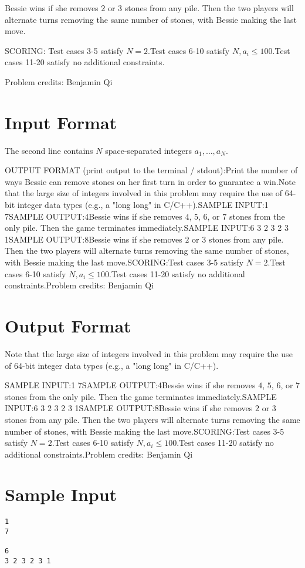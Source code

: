 \documentclass[12pt]{article}
\begin{document}
Bessie wins if she removes $2$ or $3$ stones from any pile. Then the two players
will alternate turns removing the same number of stones, with Bessie making the
last move.

SCORING:
Test cases 3-5 satisfy $N=2$.Test cases 6-10 satisfy $N,a_i\le 100$.Test cases 11-20 satisfy no additional constraints.


Problem credits: Benjamin Qi



\section*{Input Format}
The second line contains $N$ space-separated integers $a_1,\ldots,a_N$.

OUTPUT FORMAT (print output to the terminal / stdout):Print the number of ways Bessie can remove stones on her first turn in order
to guarantee a win.Note that the large size of integers involved in this problem may require the use of 64-bit integer data types (e.g., a "long long" in C/C++).SAMPLE INPUT:1
7SAMPLE OUTPUT:4Bessie wins if she removes $4$, $5$, $6$, or $7$ stones from the only pile. Then
the game terminates immediately.SAMPLE INPUT:6
3 2 3 2 3 1SAMPLE OUTPUT:8Bessie wins if she removes $2$ or $3$ stones from any pile. Then the two players
will alternate turns removing the same number of stones, with Bessie making the
last move.SCORING:Test cases 3-5 satisfy $N=2$.Test cases 6-10 satisfy $N,a_i\le 100$.Test cases 11-20 satisfy no additional constraints.Problem credits: Benjamin Qi

\section*{Output Format}
Note that the large size of integers involved in this problem may require the use of 64-bit integer data types (e.g., a "long long" in C/C++).

SAMPLE INPUT:1
7SAMPLE OUTPUT:4Bessie wins if she removes $4$, $5$, $6$, or $7$ stones from the only pile. Then
the game terminates immediately.SAMPLE INPUT:6
3 2 3 2 3 1SAMPLE OUTPUT:8Bessie wins if she removes $2$ or $3$ stones from any pile. Then the two players
will alternate turns removing the same number of stones, with Bessie making the
last move.SCORING:Test cases 3-5 satisfy $N=2$.Test cases 6-10 satisfy $N,a_i\le 100$.Test cases 11-20 satisfy no additional constraints.Problem credits: Benjamin Qi

\section*{Sample Input}
\begin{verbatim}
1
7

6
3 2 3 2 3 1
\end{verbatim}
\end{document}
